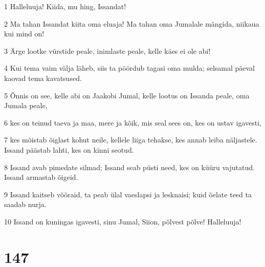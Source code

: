 \par 1 Halleluuja! Kiida, mu hing, Issandat!
\par 2 Ma tahan Issandat kiita oma eluaja! Ma tahan oma Jumalale mängida, niikaua kui mind on!
\par 3 Ärge lootke vürstide peale, inimlaste peale, kelle käes ei ole abi!
\par 4 Kui tema vaim välja läheb, siis ta pöördub tagasi oma mulda; selsamal päeval kaovad tema kavatsused.
\par 5 Õnnis on see, kelle abi on Jaakobi Jumal, kelle lootus on Issanda peale, oma Jumala peale,
\par 6 kes on teinud taeva ja maa, mere ja kõik, mis seal sees on, kes on ustav igavesti,
\par 7 kes mõistab õiglast kohut neile, kellele liiga tehakse, kes annab leiba näljastele. Issand päästab lahti, kes on kinni seotud.
\par 8 Issand avab pimedate silmad; Issand seab püsti need, kes on küüru vajutatud. Issand armastab õigeid.
\par 9 Issand kaitseb võõraid, ta peab ülal vaeslapsi ja lesknaisi; kuid õelate teed ta saadab nurja.
\par 10 Issand on kuningas igavesti, sinu Jumal, Siion, põlvest põlve! Halleluuja!

\chapter{147}


